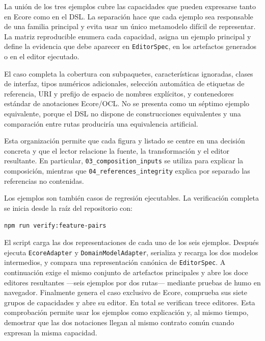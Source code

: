 La unión de los tres ejemplos cubre las capacidades que pueden expresarse tanto en
Ecore como en el DSL. La separación hace que cada ejemplo sea responsable de
una familia principal y evita usar un único metamodelo difícil de representar.
La matriz reproducible
 enumera cada capacidad,
asigna un ejemplo principal y define la evidencia que debe aparecer en
\texttt{EditorSpec}, en los artefactos generados o en el editor ejecutado.

El caso  completa la cobertura
con subpaquetes, características ignoradas, clases de interfaz, tipos numéricos
adicionales, selección automática de etiquetas de referencia, URI y prefijo de
espacio de nombres explícitos, y contenedores estándar de anotaciones Ecore/OCL.
No se presenta como un séptimo ejemplo equivalente, porque el DSL no dispone de construcciones
equivalentes y una comparación entre rutas produciría una equivalencia
artificial.

Esta organización permite que cada figura y listado se centre en una decisión
concreta y que el lector relacione la fuente, la transformación y el editor
resultante. En particular, \texttt{03\_composition\_inputs} se utiliza para
explicar la composición, mientras que \texttt{04\_references\_integrity}
explica por separado las referencias no contenidas.

Los ejemplos son también casos de regresión ejecutables. La verificación completa
se inicia desde la raíz del repositorio con:

\begin{center}
  \texttt{npm run verify:feature-pairs}
\end{center}

El script carga las dos representaciones de cada uno de los seis ejemplos. Después ejecuta
\texttt{EcoreAdapter} y
\texttt{DomainModel}\allowbreak\texttt{Adapter}, serializa y recarga los dos
modelos intermedios, y compara una representación canónica de
\texttt{EditorSpec}. A continuación exige el mismo conjunto de artefactos
principales y abre los doce editores resultantes ---seis ejemplos por dos rutas---
mediante pruebas de humo en navegador. Finalmente genera el caso exclusivo de
Ecore, comprueba sus siete grupos de capacidades y abre su editor. En total se
verifican trece editores. Esta comprobación permite usar los ejemplos como
explicación y, al mismo tiempo, demostrar que las dos notaciones llegan al mismo
contrato común cuando expresan la misma capacidad.


